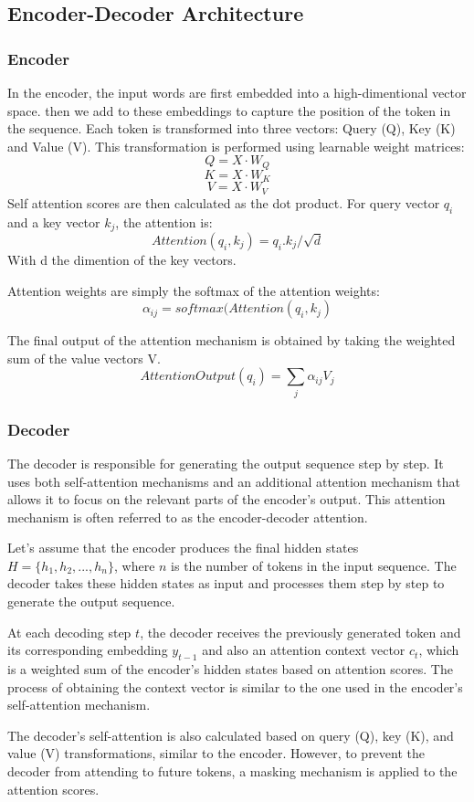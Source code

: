 \documentclass[a4paper,12pt,twoside]{report}
\begin{document}
\subsection{Encoder-Decoder Architecture}
\subsubsection{Encoder}
In the encoder, the input words are first embedded into a high-dimentional vector space. then we add to these embeddings to capture the position of the token in the sequence. Each token is transformed into three vectors: Query (Q), Key (K) and Value (V). This transformation is performed using learnable weight matrices:
$$Q = X \cdot W_{Q}$$
$$K = X \cdot W_{K}$$
$$V = X \cdot W_{V}$$
Self attention scores are then calculated as the dot product. For query vector $q_{i}$ and a key vector $k_{j}$, the attention is: 
$$Attention(q_{i},k_{j}) = q_{i} . k_{j} / \sqrt{d}$$ 
With d the dimention of the key vectors.

Attention weights are simply the softmax of the attention weights: $$\alpha_{ij} = softmax(Attention(q_{i},k_{j})$$

The final output of the attention mechanism is obtained by taking the weighted sum of the value vectors V.
$$AttentionOutput(q_{i}) = \sum_{j}\alpha_{ij} V_{j} $$
\subsubsection{Decoder}
The decoder is responsible for generating the output sequence step by step. It uses both self-attention mechanisms and an additional attention mechanism that allows it to focus on the relevant parts of the encoder's output. This attention mechanism is often referred to as the encoder-decoder attention.

Let's assume that the encoder produces the final hidden states $H = \{h_1, h_2, ..., h_n\}$, where $n$ is the number of tokens in the input sequence. The decoder takes these hidden states as input and processes them step by step to generate the output sequence.

At each decoding step $t$, the decoder receives the previously generated token and its corresponding embedding $y_{t-1}$ and also an attention context vector $c_t$, which is a weighted sum of the encoder's hidden states based on attention scores. The process of obtaining the context vector is similar to the one used in the encoder's self-attention mechanism.

The decoder's self-attention is also calculated based on query (Q), key (K), and value (V) transformations, similar to the encoder. However, to prevent the decoder from attending to future tokens, a masking mechanism is applied to the attention scores.
\end{document}
